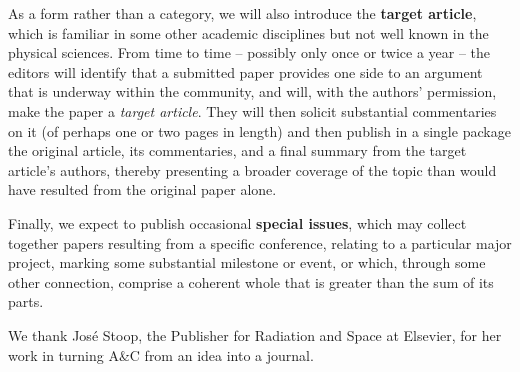 As a form rather than a category, we will also introduce the \textbf{target article}, which is familiar in some other academic disciplines but not well known in the physical sciences. From time to time -- possibly only once or twice a year -- the editors will identify that a submitted paper provides one side to an argument that is underway within the community, and will, with the authors' permission, make the paper a {\em target article\/}. They will then solicit substantial commentaries on it (of perhaps one or two pages in length) and then publish in a single package the original article, its commentaries, and a final summary from the target article's authors, thereby presenting a broader coverage of the topic than would have resulted from the original paper alone.  

Finally, we expect to publish occasional \textbf{special issues}, which may collect together papers resulting from a specific conference, relating to a particular major project, marking some substantial milestone or event, or which, through some other connection, comprise a coherent whole that is greater than the sum of its parts.  


\acknowledgements We thank Jos{\'e} Stoop, the Publisher for Radiation and Space at Elsevier, for her work in turning A\&C from an idea into a journal.





